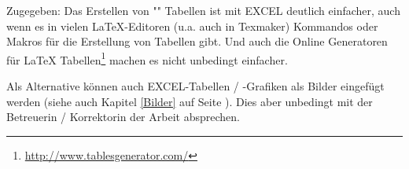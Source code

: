 Zugegeben: Das Erstellen von "" Tabellen ist mit EXCEL deutlich einfacher, auch wenn es in vielen LaTeX-Editoren (u.a. auch in Texmaker) Kommandos oder Makros für die Erstellung von Tabellen gibt. Und auch die Online Generatoren für LaTeX Tabellen\footnote{\url{http://www.tablesgenerator.com/}} machen es nicht unbedingt einfacher.

Als Alternative können auch EXCEL-Tabellen / -Grafiken als Bilder eingefügt werden (siehe auch Kapitel \ref{Bilder}  auf Seite \pageref{Bilder}). Dies aber unbedingt mit der Betreuerin / Korrektorin der Arbeit absprechen.

